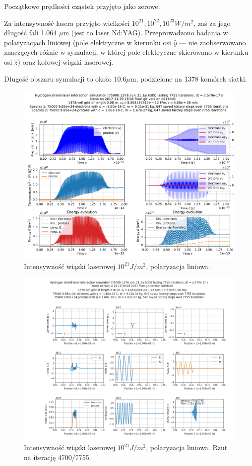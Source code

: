 Początkowe prędkości cząstek przyjęto jako zerowe.

Za intensywność lasera przyjęto wielkości $10^{21}, 10^{22}, 10^{23} W/m^2$,
zaś za jego długość fali 1.064 $\mu$m (jest to laser Nd:YAG). Przeprowadzono
badania w polaryzacjach liniowej (pole elektryczne w kierunku osi $\hat{y}$ ---
nie zaobserwowano znaczących różnic w symulacji, w której pole elektryczne
skierowano w kierunku osi $\hat{z}$) %
oraz kołowej wiązki laserowej.

Długość obszaru symulacji to około $10.6 \mu$m, podzielone na 1378 komórek siatki.

\begin{figure}[h!]
  \includegraphics[width=\textwidth]{Images/75000_1378_run_21_Ey}
  \caption{Intensywność wiązki laserowej $10^{21} J/m^2$, polaryzacja liniowa.\label{fig:laser-21-Ey}}
\end{figure}

\begin{figure}[h!]
  \includegraphics[width=\textwidth]{Images/75000_1378_run_21_Ey_004700}
  \caption{Intensywność wiązki laserowej $10^{21} J/m^2$, polaryzacja liniowa. Rzut na iterację 4700/7755.\label{fig:laser-21-Ey-snapshot}}
\end{figure}

